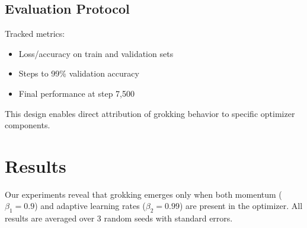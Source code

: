 \documentclass{article} %
\begin{document}
\subsection{Evaluation Protocol}
Tracked metrics:
\begin{itemize}
    \item Loss/accuracy on train and validation sets
    \item Steps to 99\% validation accuracy
    \item Final performance at step 7,500
\end{itemize}

This design enables direct attribution of grokking behavior to specific optimizer components.

\section{Results}
\label{sec:results}

Our experiments reveal that grokking emerges only when both momentum ($\beta_1=0.9$) and adaptive learning rates ($\beta_2=0.99$) are present in the optimizer. All results are averaged over 3 random seeds with standard errors.
\end{document}
